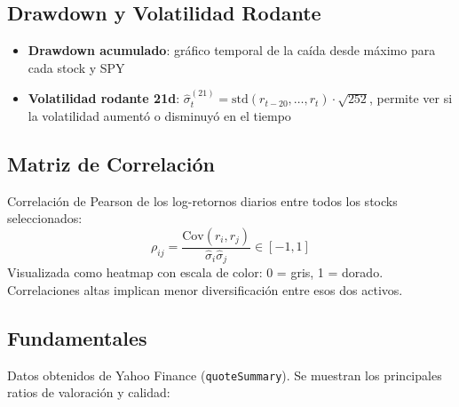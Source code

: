 \documentclass[11pt, a4paper]{article}
\newcommand{\code}[1]{\texttt{#1}}
\begin{document}
\subsection{Drawdown y Volatilidad Rodante}

\begin{itemize}
  \item \textbf{Drawdown acumulado}: gráfico temporal de la caída desde máximo para cada stock y SPY
  \item \textbf{Volatilidad rodante 21d}: $\hat{\sigma}_t^{(21)} = \text{std}(r_{t-20}, \ldots, r_t) \cdot \sqrt{252}$, permite ver si la volatilidad aumentó o disminuyó en el tiempo
\end{itemize}

\subsection{Matriz de Correlación}

Correlación de Pearson de los log-retornos diarios entre todos los stocks seleccionados:
\[ \rho_{ij} = \frac{\text{Cov}(r_i, r_j)}{\hat{\sigma}_i \hat{\sigma}_j} \in [-1, 1] \]
Visualizada como heatmap con escala de color: 0 = gris, 1 = dorado. Correlaciones altas implican menor diversificación entre esos dos activos.

\subsection{Fundamentales}

Datos obtenidos de Yahoo Finance (\code{quoteSummary}). Se muestran los principales ratios de valoración y calidad:
\end{document}
